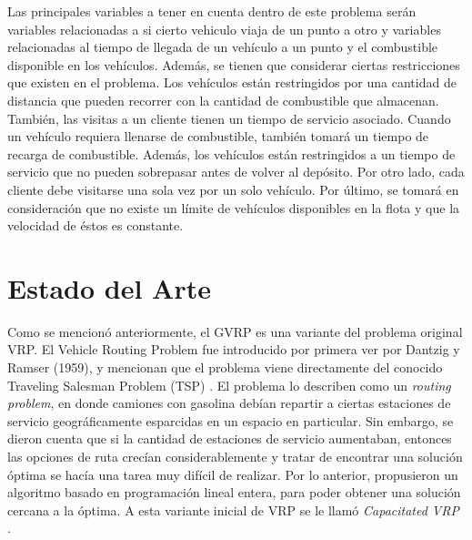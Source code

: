 \documentclass[letter, 10pt]{article}
\begin{document}
Las principales variables a tener en cuenta dentro de este problema serán variables relacionadas a si cierto vehiculo viaja de un punto a otro y variables relacionadas al tiempo de llegada de un vehículo a un punto y el combustible disponible en los vehículos. Además, se tienen que considerar ciertas restricciones que existen en el problema. Los vehículos están restringidos por una cantidad de distancia que pueden recorrer con la cantidad de combustible que almacenan. También, las visitas a un cliente tienen un tiempo de servicio asociado. Cuando un vehículo requiera llenarse de combustible, también tomará un tiempo de recarga de combustible. Además, los vehículos están restringidos a un tiempo de servicio que no pueden sobrepasar antes de volver al depósito. Por otro lado, cada cliente debe visitarse una sola vez por un solo vehículo. Por último, se tomará en consideración que no existe un límite de vehículos disponibles en la flota y que la velocidad de éstos es constante.


\section{Estado del Arte}

Como se mencionó anteriormente, el GVRP es una variante del problema original VRP. El Vehicle Routing Problem fue introducido por primera ver por Dantzig y Ramser (1959), y mencionan que el problema viene directamente del conocido Traveling Salesman Problem (TSP) \cite{RePEc:inm:ormnsc:v:6:y:1959:i:1:p:80-91}. El problema lo describen como un \emph{routing problem}, en donde camiones con gasolina debían repartir a ciertas estaciones de servicio geográficamente esparcidas en un espacio en particular. Sin embargo, se dieron cuenta que si la cantidad de estaciones de servicio aumentaban, entonces las opciones de ruta crecían considerablemente y tratar de encontrar una solución óptima se hacía una tarea muy difícil de realizar. Por lo anterior, propusieron un algoritmo basado en programación lineal entera, para poder obtener una solución cercana a la óptima. A esta variante inicial de VRP se le llamó \emph{Capacitated VRP} \cite{LIN20141118}.
\\
\end{document}
